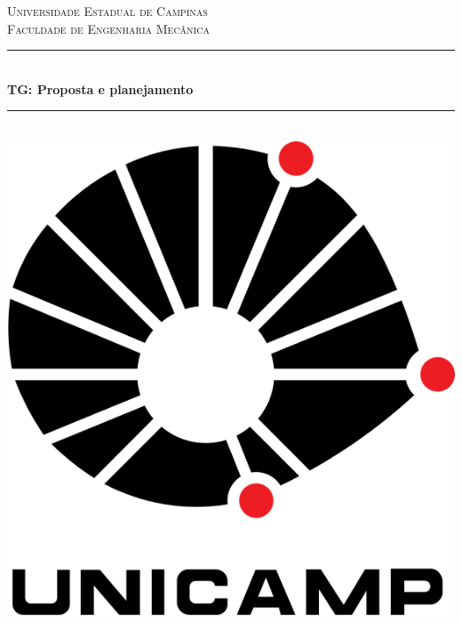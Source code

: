 \documentclass[12pt]{article} %
\begin{document}

\begin{titlepage}

\newcommand{\HRule}{\rule{\linewidth}{0.5mm}} %

\center %

\textsc{\LARGE Universidade Estadual de Campinas}\\[1.5cm] %
\textsc{\Large Faculdade de Engenharia Mecânica}\\[0.5cm] %

\HRule \\[0.4cm]
{ \huge \bfseries TG: Proposta e planejamento}\\[0.4cm] %
\HRule \\[1cm]

\includegraphics[scale=0.3]{pictures/unicamp.png}\\
\vspace{12mm}



\end{titlepage}
\end{document}
